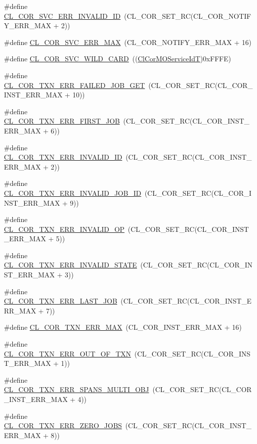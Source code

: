 \begin{CompactItemize}
\#define \hyperlink{group__group13_ga230}{CL\_\-COR\_\-SVC\_\-ERR\_\-INVALID\_\-ID}~(CL\_\-COR\_\-SET\_\-RC(CL\_\-COR\_\-NOTIFY\_\-ERR\_\-MAX + 2))
\item 
\#define \hyperlink{group__group13_ga233}{CL\_\-COR\_\-SVC\_\-ERR\_\-MAX}~(CL\_\-COR\_\-NOTIFY\_\-ERR\_\-MAX + 16)
\item 
\#define \hyperlink{group__group13_ga293}{CL\_\-COR\_\-SVC\_\-WILD\_\-CARD}~((\hyperlink{group__group13_ga27}{Cl\-Cor\-MOService\-Id\-T})0x\-FFFE)
\item 
\#define \hyperlink{group__group13_ga223}{CL\_\-COR\_\-TXN\_\-ERR\_\-FAILED\_\-JOB\_\-GET}~(CL\_\-COR\_\-SET\_\-RC(CL\_\-COR\_\-INST\_\-ERR\_\-MAX + 10))
\item 
\#define \hyperlink{group__group13_ga219}{CL\_\-COR\_\-TXN\_\-ERR\_\-FIRST\_\-JOB}~(CL\_\-COR\_\-SET\_\-RC(CL\_\-COR\_\-INST\_\-ERR\_\-MAX + 6))
\item 
\#define \hyperlink{group__group13_ga215}{CL\_\-COR\_\-TXN\_\-ERR\_\-INVALID\_\-ID}~(CL\_\-COR\_\-SET\_\-RC(CL\_\-COR\_\-INST\_\-ERR\_\-MAX + 2))
\item 
\#define \hyperlink{group__group13_ga222}{CL\_\-COR\_\-TXN\_\-ERR\_\-INVALID\_\-JOB\_\-ID}~(CL\_\-COR\_\-SET\_\-RC(CL\_\-COR\_\-INST\_\-ERR\_\-MAX + 9))
\item 
\#define \hyperlink{group__group13_ga218}{CL\_\-COR\_\-TXN\_\-ERR\_\-INVALID\_\-OP}~(CL\_\-COR\_\-SET\_\-RC(CL\_\-COR\_\-INST\_\-ERR\_\-MAX + 5))
\item 
\#define \hyperlink{group__group13_ga216}{CL\_\-COR\_\-TXN\_\-ERR\_\-INVALID\_\-STATE}~(CL\_\-COR\_\-SET\_\-RC(CL\_\-COR\_\-INST\_\-ERR\_\-MAX + 3))
\item 
\#define \hyperlink{group__group13_ga220}{CL\_\-COR\_\-TXN\_\-ERR\_\-LAST\_\-JOB}~(CL\_\-COR\_\-SET\_\-RC(CL\_\-COR\_\-INST\_\-ERR\_\-MAX + 7))
\item 
\#define \hyperlink{group__group13_ga225}{CL\_\-COR\_\-TXN\_\-ERR\_\-MAX}~(CL\_\-COR\_\-INST\_\-ERR\_\-MAX + 16)
\item 
\#define \hyperlink{group__group13_ga214}{CL\_\-COR\_\-TXN\_\-ERR\_\-OUT\_\-OF\_\-TXN}~(CL\_\-COR\_\-SET\_\-RC(CL\_\-COR\_\-INST\_\-ERR\_\-MAX + 1))
\item 
\#define \hyperlink{group__group13_ga217}{CL\_\-COR\_\-TXN\_\-ERR\_\-SPANS\_\-MULTI\_\-OBJ}~(CL\_\-COR\_\-SET\_\-RC(CL\_\-COR\_\-INST\_\-ERR\_\-MAX + 4))
\item 
\#define \hyperlink{group__group13_ga221}{CL\_\-COR\_\-TXN\_\-ERR\_\-ZERO\_\-JOBS}~(CL\_\-COR\_\-SET\_\-RC(CL\_\-COR\_\-INST\_\-ERR\_\-MAX + 8))

\end{CompactItemize}
